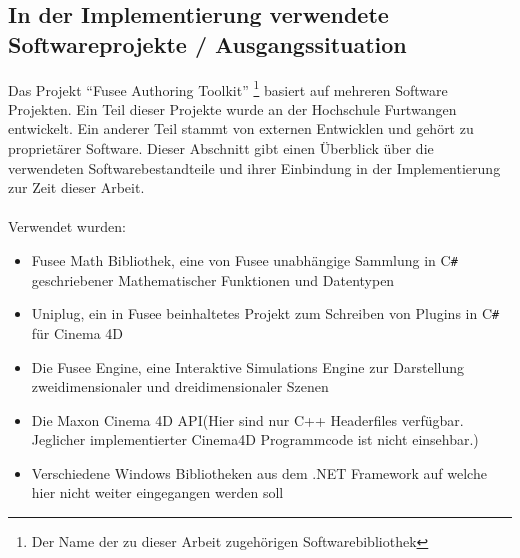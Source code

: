 \documentclass[pagesize, paper=a4, fontsize=12pt, titlepage=true, headings=small, headnosepline, abstractoff, liststotoc, nochapterprefix, plainheadsepline, twoside]{scrreprt}
\newcommand{\CSS}{C\texttt{\# }}
\begin{document}
\subsection{In der Implementierung verwendete Softwareprojekte / Ausgangssituation}
Das Projekt “Fusee Authoring Toolkit” \footnote{Der Name der zu dieser Arbeit zugehörigen Softwarebibliothek} basiert auf mehreren Software Projekten. Ein Teil dieser Projekte wurde an der Hochschule Furtwangen entwickelt. Ein anderer Teil stammt von externen Entwicklen und gehört zu proprietärer Software. Dieser Abschnitt gibt einen Überblick über die verwendeten Softwarebestandteile und ihrer Einbindung in der Implementierung zur Zeit dieser Arbeit.
\\
\\
Verwendet wurden:
\begin{itemize}
\item Fusee Math Bibliothek, eine von Fusee unabhängige Sammlung in \CSS geschriebener Mathematischer Funktionen und Datentypen
\item Uniplug, ein in Fusee beinhaltetes Projekt zum Schreiben von Plugins in \CSS für Cinema 4D
\item Die Fusee Engine, eine Interaktive Simulations Engine zur Darstellung zweidimensionaler und dreidimensionaler Szenen
\item Die Maxon Cinema 4D API(Hier sind nur C++ Headerfiles verfügbar. Jeglicher implementierter Cinema4D Programmcode ist nicht einsehbar.)
\item Verschiedene Windows Bibliotheken aus dem .NET Framework auf welche hier nicht weiter eingegangen werden soll
\end{itemize}
\end{document}
